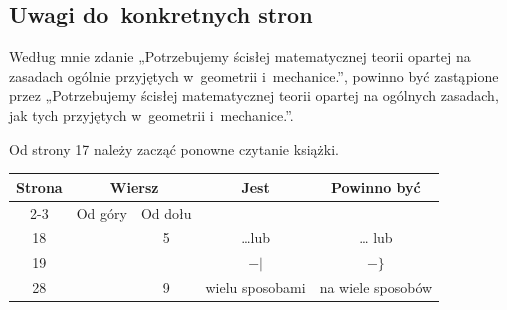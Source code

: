 \documentclass[a4paper,11pt]{article}
\numberwithin{equation}{section}
\begin{document}
\label{sec:Feller-Wstep-do-rachunku-ETC}








\subsection{Uwagi do~konkretnych stron}

\label{subsec:Uwagi-do-konkretnych-stron}



\noindent
{} Według mnie zdanie „Potrzebujemy ścisłej
matematycznej teorii opartej na zasadach ogólnie przyjętych w~geometrii
i~mechanice.”, powinno być zastąpione przez „Potrzebujemy ścisłej
matematycznej teorii opartej na ogólnych zasadach, jak tych przyjętych
w~geometrii i~mechanice.”.

{\Large Od strony 17 należy zacząć ponowne czytanie książki.}





\begin{center}

  \begin{tabular}{|c|c|c|c|c|}
    \hline
    Strona & \multicolumn{2}{c|}{Wiersz} & Jest
                              & Powinno być \\ \cline{2-3}
    & Od góry & Od dołu & & \\
    \hline
    18 & & 5 & \ldots lub & \ldots{} lub \\
    19 & & & $- |$ & $- \}$ \\
    28 & & 9 & wielu sposobami & na wiele sposobów \\
    \hline
  \end{tabular}

\end{center}
\end{document}
